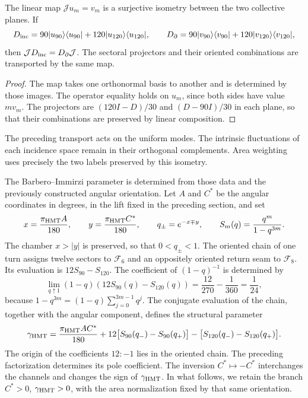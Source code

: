 \begin{proposition}
\label{rev4:ae:colectivo}
The linear map \(\mathcal J u_m=v_m\) is a surjective
isometry between the two collective planes. If
\[
 D_{\rm inc}=90|u_{90}\rangle\langle u_{90}|
             +120|u_{120}\rangle\langle u_{120}|,
 \qquad
 D_\partial=90|v_{90}\rangle\langle v_{90}|
             +120|v_{120}\rangle\langle v_{120}|,
\]
then \(\mathcal J D_{\rm inc}=D_\partial\mathcal J\).
The sectoral projectors and their oriented combinations are
transported by the same map.
\end{proposition}
\begin{proof}
The map takes one orthonormal basis to another and is determined
by those images. The operator equality holds on \(u_m\),
since both sides have value \(m v_m\). The projectors are
\((120I-D)/30\) and \((D-90I)/30\) in each plane, so that
their combinations are preserved by linear composition.
\end{proof}

The preceding transport acts on the uniform modes. The intrinsic
fluctuations of each incidence space remain in their orthogonal
complements. Area weighting uses precisely the two labels
preserved by this isometry.

The Barbero--Immirzi parameter is determined from those data and
the previously constructed angular orientation. Let \(A\) and \(C^*\)
be the angular coordinates in degrees, in the lift fixed in the
preceding section, and set
\[
 x=\frac{\pi_{\rm HMT}A}{180},\qquad
 y=\frac{\pi_{\rm HMT}C^*}{180},\qquad
 q_\pm=e^{-x\mp y},\qquad
 S_m(q)=\frac{q^m}{1-q^{3m}}.
\]
The chamber \(x>|y|\) is preserved, so that \(0<q_\pm<1\).
The oriented chain of one turn assigns twelve sectors to
\(\mathcal F_6\) and an oppositely oriented return seam
to \(\mathcal F_8\). Its evaluation is \(12S_{90}-S_{120}\).
The coefficient of \((1-q)^{-1}\) is determined by
\[
 \lim_{q\uparrow1}(1-q)(12S_{90}(q)-S_{120}(q))
 =\frac{12}{270}-\frac1{360}=\frac1{24},
\]
because \(1-q^{3m}=(1-q)\sum_{j=0}^{3m-1}q^j\).
The conjugate evaluation of the chain, together with the angular component,
defines the structural parameter
\begin{equation}
 \gamma_{\rm HMT}
 =\frac{\pi_{\rm HMT}AC^*}{180}
 +12\bigl[S_{90}(q_-)-S_{90}(q_+)\bigr]
 -\bigl[S_{120}(q_-)-S_{120}(q_+)\bigr].
 \label{rev4:ae:gamma}
\end{equation}
The origin of the coefficients \(12:-1\) lies in the oriented chain.
The preceding factorization determines its pole coefficient.
The inversion \(C^*\mapsto-C^*\) interchanges the channels and changes
the sign of \(\gamma_{\rm HMT}\). In what follows, we retain the
branch \(C^*>0\), \(\gamma_{\rm HMT}>0\), with the area
normalization fixed by that same orientation.

